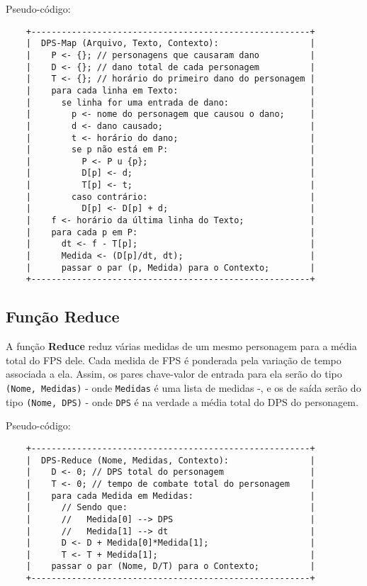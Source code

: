 \documentclass[a4paper,11pt]{article}
\begin{document}
    Pseudo-código:
    
    \begin{verbatim}
    +-------------------------------------------------------+
    |  DPS-Map (Arquivo, Texto, Contexto):                  |
    |    P <- {}; // personagens que causaram dano          |
    |    D <- {}; // dano total de cada personagem          |
    |    T <- {}; // horário do primeiro dano do personagem |
    |    para cada linha em Texto:                          |
    |      se linha for uma entrada de dano:                |
    |        p <- nome do personagem que causou o dano;     |
    |        d <- dano causado;                             |
    |        t <- horário do dano;                          |
    |        se p não está em P:                            |
    |          P <- P u {p};                                |
    |          D[p] <- d;                                   |
    |          T[p] <- t;                                   |
    |        caso contrário:                                |
    |          D[p] <- D[p] + d;                            |
    |    f <- horário da última linha do Texto;             |
    |    para cada p em P:                                  |
    |      dt <- f - T[p];                                  |
    |      Medida <- (D[p]/dt, dt);                         |
    |      passar o par (p, Medida) para o Contexto;        |
    +-------------------------------------------------------+
    \end{verbatim}
  
  \subsection{Função \textbf{Reduce}}
  
    A função \textbf{Reduce} reduz várias medidas de um mesmo personagem para a
    média total do FPS dele. Cada medida de FPS é ponderada pela variação de
    tempo associada a ela. Assim, os pares chave-valor de entrada para ela serão
    do tipo \verb$(Nome, Medidas)$ - onde \verb$Medidas$ é uma lista de medidas
    -, e os de saída serão do tipo \verb$(Nome, DPS)$ - onde \verb$DPS$ é na
    verdade a média total do DPS do personagem.
    
    Pseudo-código:
    
    \begin{verbatim}
    +-------------------------------------------------------+
    |  DPS-Reduce (Nome, Medidas, Contexto):                |
    |    D <- 0; // DPS total do personagem                 |
    |    T <- 0; // tempo de combate total do personagem    |
    |    para cada Medida em Medidas:                       |
    |      // Sendo que:                                    |
    |      //   Medida[0] --> DPS                           |
    |      //   Medida[1] --> dt                            |
    |      D <- D + Medida[0]*Medida[1];                    |
    |      T <- T + Medida[1];                              |
    |    passar o par (Nome, D/T) para o Contexto;          |
    +-------------------------------------------------------+
    \end{verbatim}
    
\end{document}
